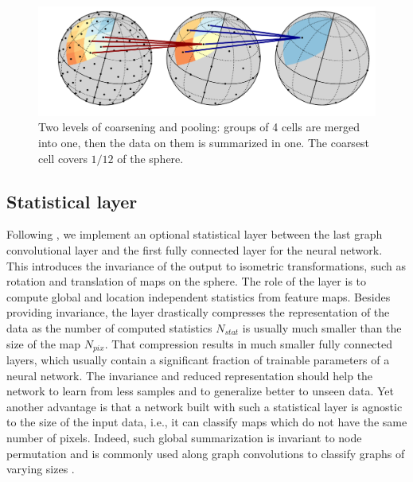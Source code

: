 \documentclass[final,twocolumn,3p,times,authoryear]{elsarticle}
\newcommand{\1}{\b{1}}              %
\newcommand{\0}{\b{0}}              %
\begin{document}

\begin{figure}
	\centering
	\includegraphics[trim=1.1cm 0cm 0cm 0cm, width=\linewidth]{figures/figure_pooling_svg.pdf}
	\caption{Two levels of coarsening and pooling: groups of 4 cells are merged into one, then the data on them is summarized in one. The coarsest cell covers $1/12$ of the sphere.}
	\label{fig:pooling}
\end{figure}

\subsection{Statistical layer}
\label{sec:stat_layer}

Following \citet{khasanova2017tigranet}, we implement an optional statistical layer between the last graph convolutional layer and the first fully connected layer for the neural network.
This introduces the invariance of the output to isometric transformations, such as rotation and translation of maps on the sphere.
The role of the layer is to compute global and location independent statistics from feature maps.
Besides providing invariance, the layer drastically compresses the representation of the data as the number of computed statistics $N_{stat}$ is usually much smaller than the size of the map $N_{pix}$. That compression results in much smaller fully connected layers, which usually contain a significant fraction of trainable parameters of a neural network.
The invariance and reduced representation should help the network to learn from less samples and to generalize better to unseen data. Yet another advantage is that a network built with such a statistical layer is agnostic to the size of the input data, i.e., it can classify maps which do not have the same number of pixels. Indeed, such global summarization is invariant to node permutation and is commonly used along graph convolutions to classify graphs of varying sizes \citep{duvenaud2015gcn, li2015gatedgnn}.
\end{document}
